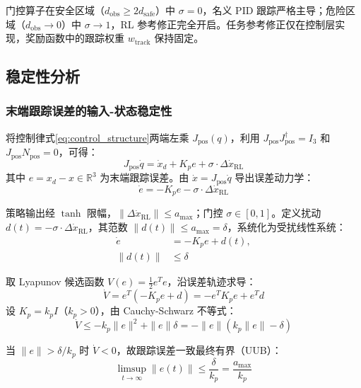 \documentclass[10pt,conference]{IEEEtran}
\begin{document}
门控算子在安全区域（$d_{\text{obs}} \geq2d_{\text{safe}}$）中 $\sigma=0$，名义 PID 跟踪严格主导；危险区域（$d_{\text{obs}} \to0$）中 $\sigma\to1$，RL 参考修正完全开启。任务参考修正仅在控制层实现，奖励函数中的跟踪权重 $w_{\text{track}}$ 保持固定。

\subsection{稳定性分析}
\label{sec:stability}

\subsubsection{末端跟踪误差的输入-状态稳定性}
将控制律式\eqref{eq:control_structure}两端左乘 $J_{\text{pos}}(q)$，利用 $J_{\text{pos}}J_{\text{pos}}^\dagger = I_3$ 和 $J_{\text{pos}}N_{\text{pos}} = 0$，可得：
\begin{equation}
J_{\text{pos}}\dot{q} = \dot{x}_d + K_p e + \sigma \cdot \Delta\dot{x}_{\text{RL}}
\end{equation}
其中 $e = x_d - x \in \mathbb{R}^3$ 为末端跟踪误差。由 $\dot{x} = J_{\text{pos}}\dot{q}$ 导出误差动力学：
\begin{equation}
\dot{e} = -K_p e - \sigma \cdot \Delta\dot{x}_{\text{RL}}
\label{eq:error_dynamics}
\end{equation}

策略输出经 $\tanh$ 限幅，$\|\Delta\dot{x}_{\text{RL}}\| \leq a_{\max}$；门控 $\sigma \in [0, 1]$。定义扰动 $d(t) = -\sigma \cdot \Delta\dot{x}_{\text{RL}}$，其范数 $\|d(t)\| \leq a_{\max} = \delta$，系统化为受扰线性系统：
\begin{equation}
\begin{aligned}
\dot{e} &= -K_p e + d(t), \\
\|d(t)\| &\leq \delta
\end{aligned}
\label{eq:perturbed_system}
\end{equation}

取 Lyapunov 候选函数 $V(e) = \frac{1}{2} e^T e$，沿误差轨迹求导：
\begin{equation}
\dot{V} = e^T(-K_p e + d) = -e^T K_p e + e^T d
\end{equation}
设 $K_p = k_p I$（$k_p > 0$），由 Cauchy-Schwarz 不等式：
\begin{equation}
\dot{V} \leq -k_p\|e\|^2 + \|e\|\delta = -\|e\|(k_p\|e\| - \delta)
\end{equation}

当 $\|e\| > \delta/k_p$ 时 $\dot{V} < 0$，故跟踪误差一致最终有界（UUB）：
\begin{equation}
\boxed{\limsup_{t\to\infty} \|e(t)\| \leq \frac{\delta}{k_p} = \frac{a_{\max}}{k_p}}
\label{eq:uub_bound}
\end{equation}
\end{document}
